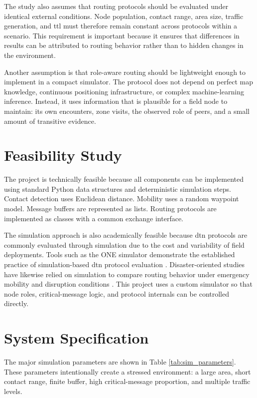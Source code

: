 The study also assumes that routing protocols should be evaluated under identical external conditions. Node population, contact range, area size, traffic generation, and \ac{ttl} must therefore remain constant across protocols within a scenario. This requirement is important because it ensures that differences in results can be attributed to routing behavior rather than to hidden changes in the environment.

Another assumption is that role-aware routing should be lightweight enough to implement in a compact simulator. The protocol does not depend on perfect map knowledge, continuous positioning infrastructure, or complex machine-learning inference. Instead, it uses information that is plausible for a field node to maintain: its own encounters, zone visits, the observed role of peers, and a small amount of transitive evidence.

\section{Feasibility Study}
The project is technically feasible because all components can be implemented using standard Python data structures and deterministic simulation steps. Contact detection uses Euclidean distance. Mobility uses a random waypoint model. Message buffers are represented as lists. Routing protocols are implemented as classes with a common exchange interface.

The simulation approach is also academically feasible because \ac{dtn} protocols are commonly evaluated through simulation due to the cost and variability of field deployments. Tools such as the ONE simulator demonstrate the established practice of simulation-based \ac{dtn} protocol evaluation \citep{keranen2009one}. Disaster-oriented studies have likewise relied on simulation to compare routing behavior under emergency mobility and disruption conditions \citep{martincampillo2013disaster,rosasolivos2020csar}. This project uses a custom simulator so that node roles, critical-message logic, and protocol internals can be controlled directly.

\section{System Specification}
The major simulation parameters are shown in Table \ref{tab:sim_parameters}. These parameters intentionally create a stressed environment: a large area, short contact range, finite buffer, high critical-message proportion, and multiple traffic levels.

